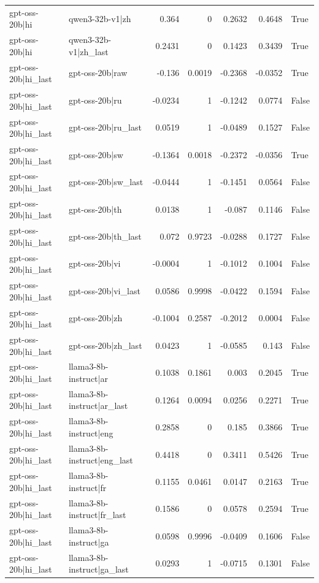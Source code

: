 \begin{table}
\begin{tabular}{l l r r r r l}
gpt-oss-20b|hi & qwen3-32b-v1|zh & 0.364 & 0 & 0.2632 & 0.4648 & True \\
gpt-oss-20b|hi & qwen3-32b-v1|zh_last & 0.2431 & 0 & 0.1423 & 0.3439 & True \\
gpt-oss-20b|hi_last & gpt-oss-20b|raw & -0.136 & 0.0019 & -0.2368 & -0.0352 & True \\
gpt-oss-20b|hi_last & gpt-oss-20b|ru & -0.0234 & 1 & -0.1242 & 0.0774 & False \\
gpt-oss-20b|hi_last & gpt-oss-20b|ru_last & 0.0519 & 1 & -0.0489 & 0.1527 & False \\
gpt-oss-20b|hi_last & gpt-oss-20b|sw & -0.1364 & 0.0018 & -0.2372 & -0.0356 & True \\
gpt-oss-20b|hi_last & gpt-oss-20b|sw_last & -0.0444 & 1 & -0.1451 & 0.0564 & False \\
gpt-oss-20b|hi_last & gpt-oss-20b|th & 0.0138 & 1 & -0.087 & 0.1146 & False \\
gpt-oss-20b|hi_last & gpt-oss-20b|th_last & 0.072 & 0.9723 & -0.0288 & 0.1727 & False \\
gpt-oss-20b|hi_last & gpt-oss-20b|vi & -0.0004 & 1 & -0.1012 & 0.1004 & False \\
gpt-oss-20b|hi_last & gpt-oss-20b|vi_last & 0.0586 & 0.9998 & -0.0422 & 0.1594 & False \\
gpt-oss-20b|hi_last & gpt-oss-20b|zh & -0.1004 & 0.2587 & -0.2012 & 0.0004 & False \\
gpt-oss-20b|hi_last & gpt-oss-20b|zh_last & 0.0423 & 1 & -0.0585 & 0.143 & False \\
gpt-oss-20b|hi_last & llama3-8b-instruct|ar & 0.1038 & 0.1861 & 0.003 & 0.2045 & True \\
gpt-oss-20b|hi_last & llama3-8b-instruct|ar_last & 0.1264 & 0.0094 & 0.0256 & 0.2271 & True \\
gpt-oss-20b|hi_last & llama3-8b-instruct|eng & 0.2858 & 0 & 0.185 & 0.3866 & True \\
gpt-oss-20b|hi_last & llama3-8b-instruct|eng_last & 0.4418 & 0 & 0.3411 & 0.5426 & True \\
gpt-oss-20b|hi_last & llama3-8b-instruct|fr & 0.1155 & 0.0461 & 0.0147 & 0.2163 & True \\
gpt-oss-20b|hi_last & llama3-8b-instruct|fr_last & 0.1586 & 0 & 0.0578 & 0.2594 & True \\
gpt-oss-20b|hi_last & llama3-8b-instruct|ga & 0.0598 & 0.9996 & -0.0409 & 0.1606 & False \\
gpt-oss-20b|hi_last & llama3-8b-instruct|ga_last & 0.0293 & 1 & -0.0715 & 0.1301 & False \\

\end{tabular}
\end{table}
